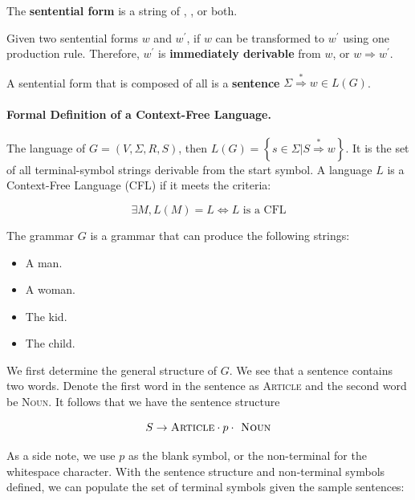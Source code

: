 \begin{defn}
    The \textbf{sentential form} is a string of , , or both. 
\end{defn}

\begin{defn}
    Given two sentential forms $w$ and $w^\prime$, if $w$ can be transformed to $w^\prime$ using one production rule. Therefore, $w^\prime$ is \textbf{immediately derivable} from $w$, or $w\Rightarrow w^\prime$.
\end{defn}

\begin{defn}
    A sentential form that is composed of all  is a \textbf{sentence} $\Sigma \overset{*}{\Rightarrow} w\in L(G)$.
\end{defn}

\paragraph{Formal Definition of a Context-Free Language.} The language of $G=\left(V,\Sigma,R,S\right)$, then $L(G)=\left\{s\in\Sigma|S\overset{*}{\Rightarrow}w\right\}$. It is the set of all terminal-symbol strings derivable from the start symbol.  A language $L$ is a Context-Free Language (CFL) if it meets the criteria: 

\[
\exists M, L(M)=L \Longleftrightarrow L\text{ is a CFL}
\]

\begin{ex}
    The grammar $G$ is a grammar that can produce the following strings:
\end{ex}
\begin{itemize}
    \item A man.
    \item A woman.
    \item The kid.
    \item The child.
\end{itemize}

We first determine the general structure of $G$. We see that a sentence contains two words. Denote the first word in the sentence as \textsc{Article} and the second word be \textsc{Noun}. It follows that we have the sentence structure

\[
    S\to \textsc{Article} \cdot p \cdot \textsc{ Noun}
\]

As a side note, we use $p$ as the blank symbol, or the non-terminal for the whitespace character. With the sentence structure and non-terminal symbols defined, we can populate the set of terminal symbols given the sample sentences:

